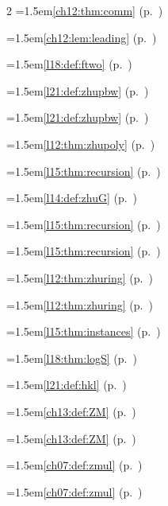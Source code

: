 \begin{multicols}{2}
\hangindent=1.5em\quad \ref{ch12:thm:comm} (p.~\pageref{ch12:thm:comm})\par
\hangindent=1.5em\quad \ref{ch12:lem:leading} (p.~\pageref{ch12:lem:leading})\par
\hangindent=1.5em\quad \ref{l18:def:ftwo} (p.~\pageref{l18:def:ftwo})\par
\hangindent=1.5em\quad \ref{l21:def:zhupbw} (p.~\pageref{l21:def:zhupbw})\par
\hangindent=1.5em\quad \ref{l21:def:zhupbw} (p.~\pageref{l21:def:zhupbw})\par
\hangindent=1.5em\quad \ref{l12:thm:zhupoly} (p.~\pageref{l12:thm:zhupoly})\par
\hangindent=1.5em\quad \ref{l15:thm:recursion} (p.~\pageref{l15:thm:recursion})\par
\hangindent=1.5em\quad \ref{l14:def:zhuG} (p.~\pageref{l14:def:zhuG})\par
\hangindent=1.5em\quad \ref{l15:thm:recursion} (p.~\pageref{l15:thm:recursion})\par
\hangindent=1.5em\quad \ref{l15:thm:recursion} (p.~\pageref{l15:thm:recursion})\par
\hangindent=1.5em\quad \ref{l12:thm:zhuring} (p.~\pageref{l12:thm:zhuring})\par
\hangindent=1.5em\quad \ref{l12:thm:zhuring} (p.~\pageref{l12:thm:zhuring})\par
\hangindent=1.5em\quad \ref{l15:thm:instances} (p.~\pageref{l15:thm:instances})\par
\hangindent=1.5em\quad \ref{l18:thm:logS} (p.~\pageref{l18:thm:logS})\par
\hangindent=1.5em\quad \ref{l21:def:hkl} (p.~\pageref{l21:def:hkl})\par
\hangindent=1.5em\quad \ref{ch13:def:ZM} (p.~\pageref{ch13:def:ZM})\par
\hangindent=1.5em\quad \ref{ch13:def:ZM} (p.~\pageref{ch13:def:ZM})\par
\hangindent=1.5em\quad \ref{ch07:def:zmul} (p.~\pageref{ch07:def:zmul})\par
\hangindent=1.5em\quad \ref{ch07:def:zmul} (p.~\pageref{ch07:def:zmul})\par

\end{multicols}
